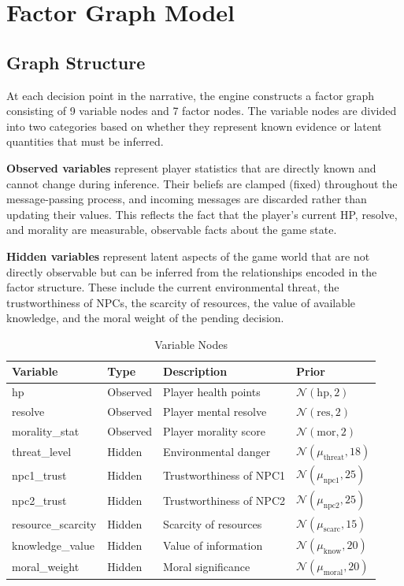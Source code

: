 \documentclass[journal]{IEEEtran}
\begin{document}
\section{Factor Graph Model}

\subsection{Graph Structure}

At each decision point in the narrative, the engine constructs a factor graph consisting of 9 variable nodes and 7 factor nodes. The variable nodes are divided into two categories based on whether they represent known evidence or latent quantities that must be inferred.

\textbf{Observed variables} represent player statistics that are directly known and cannot change during inference. Their beliefs are clamped (fixed) throughout the message-passing process, and incoming messages are discarded rather than updating their values. This reflects the fact that the player's current HP, resolve, and morality are measurable, observable facts about the game state.

\textbf{Hidden variables} represent latent aspects of the game world that are not directly observable but can be inferred from the relationships encoded in the factor structure. These include the current environmental threat, the trustworthiness of NPCs, the scarcity of resources, the value of available knowledge, and the moral weight of the pending decision.

\begin{table}[!ht]
\centering
\caption{Variable Nodes}
\label{tab:variables}
\small
\setlength{\tabcolsep}{3pt}
\begin{tabular}{|l|l|l|l|}
\hline
\textbf{Variable} & \textbf{Type} & \textbf{Description} & \textbf{Prior} \\
\hline
hp & Observed & Player health points & $\mathcal{N}(\text{hp}, 2)$ \\
\hline
resolve & Observed & Player mental resolve & $\mathcal{N}(\text{res}, 2)$ \\
\hline
morality\_stat & Observed & Player morality score & $\mathcal{N}(\text{mor}, 2)$ \\
\hline
threat\_level & Hidden & Environmental danger & $\mathcal{N}(\mu_{\text{threat}}, 18)$ \\
\hline
npc1\_trust & Hidden & Trustworthiness of NPC1 & $\mathcal{N}(\mu_{\text{npc1}}, 25)$ \\
\hline
npc2\_trust & Hidden & Trustworthiness of NPC2 & $\mathcal{N}(\mu_{\text{npc2}}, 25)$ \\
\hline
resource\_scarcity & Hidden & Scarcity of resources & $\mathcal{N}(\mu_{\text{scarc}}, 15)$ \\
\hline
knowledge\_value & Hidden & Value of information & $\mathcal{N}(\mu_{\text{know}}, 20)$ \\
\hline
moral\_weight & Hidden & Moral significance & $\mathcal{N}(\mu_{\text{moral}}, 20)$ \\
\hline
\end{tabular}
\vspace{-4pt}
\end{table}
\end{document}
